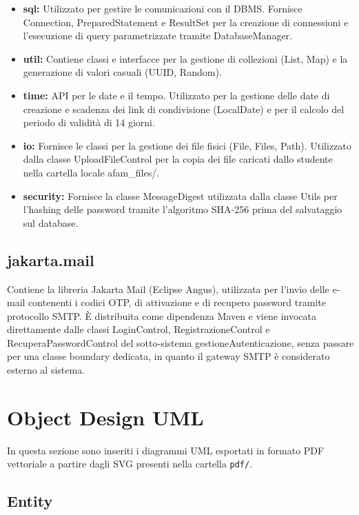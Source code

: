 \documentclass[12pt,a4paper]{article}
\begin{document}
\begin{itemize}
  \item \textbf{sql:} Utilizzato per gestire le comunicazioni con il DBMS. Fornisce Connection, PreparedStatement e ResultSet per la creazione di connessioni e l'esecuzione di query parametrizzate tramite DatabaseManager.
  \item \textbf{util:} Contiene classi e interfacce per la gestione di collezioni (List, Map) e la generazione di valori casuali (UUID, Random).
  \item \textbf{time:} API per le date e il tempo. Utilizzato per la gestione delle date di creazione e scadenza dei link di condivisione (LocalDate) e per il calcolo del periodo di validità di 14 giorni.
  \item \textbf{io:} Fornisce le classi per la gestione dei file fisici (File, Files, Path). Utilizzato dalla classe UploadFileControl per la copia dei file caricati dallo studente nella cartella locale afam\_files/.
  \item \textbf{security:} Fornisce la classe MessageDigest utilizzata dalla classe Utils per l'hashing delle password tramite l'algoritmo SHA-256 prima del salvataggio sul database.
\end{itemize}

\subsection{jakarta.mail}

Contiene la libreria Jakarta Mail (Eclipse Angus), utilizzata per l'invio delle e-mail contenenti i codici OTP, di attivazione e di recupero password tramite protocollo SMTP. È distribuita come dipendenza Maven e viene invocata direttamente dalle classi LoginControl, RegistrazioneControl e RecuperaPasswordControl del sotto-sistema gestioneAutenticazione, senza passare per una classe boundary dedicata, in quanto il gateway SMTP è considerato esterno al sistema.


\clearpage
\section{Object Design UML}

In questa sezione sono inseriti i diagrammi UML esportati in formato PDF vettoriale a partire dagli SVG presenti nella cartella \texttt{pdf/}.

\subsection{Entity}
\end{document}
